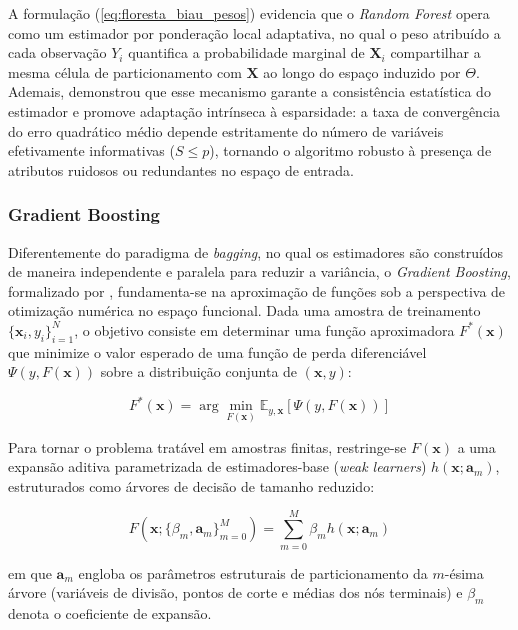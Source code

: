 A formulação (\ref{eq:floresta_biau_pesos}) evidencia que o \textit{Random Forest} opera como um estimador por ponderação local adaptativa, no qual o peso atribuído a cada observação $Y_i$ quantifica a probabilidade marginal de $\mathbf{X}_i$ compartilhar a mesma célula de particionamento com $\mathbf{X}$ ao longo do espaço induzido por $\Theta$. Ademais,  demonstrou que esse mecanismo garante a consistência estatística do estimador e promove adaptação intrínseca à esparsidade: a taxa de convergência do erro quadrático médio depende estritamente do número de variáveis efetivamente informativas ($S \le p$), tornando o algoritmo robusto à presença de atributos ruidosos ou redundantes no espaço de entrada.

\subsubsection{Gradient Boosting}

Diferentemente do paradigma de \textit{bagging}, no qual os estimadores são construídos de maneira independente e paralela para reduzir a variância, o \textit{Gradient Boosting}, formalizado por , fundamenta-se na aproximação de funções sob a perspectiva de otimização numérica no espaço funcional. Dada uma amostra de treinamento $\{\mathbf{x}_i, y_i\}_{i=1}^{N}$, o objetivo consiste em determinar uma função aproximadora $F^*(\mathbf{x})$ que minimize o valor esperado de uma função de perda diferenciável $\Psi(y, F(\mathbf{x}))$ sobre a distribuição conjunta de $(\mathbf{x}, y)$:

\begin{equation}
    F^*(\mathbf{x}) = \arg\min_{F(\mathbf{x})} \mathbb{E}_{y, \mathbf{x}}\left[\Psi(y, F(\mathbf{x}))\right] \label{eq:obj_friedman}
\end{equation}

Para tornar o problema tratável em amostras finitas, restringe-se $F(\mathbf{x})$ a uma expansão aditiva parametrizada de estimadores-base (\textit{weak learners}) $h(\mathbf{x}; \mathbf{a}_m)$, estruturados como árvores de decisão de tamanho reduzido:

\begin{equation}
    F(\mathbf{x}; \{\beta_m, \mathbf{a}_m\}_{m=0}^{M}) = \sum_{m=0}^{M} \beta_m h(\mathbf{x}; \mathbf{a}_m) \label{eq:expansao_aditiva_gb}
\end{equation}

\noindent em que $\mathbf{a}_m$ engloba os parâmetros estruturais de particionamento da $m$-ésima árvore (variáveis de divisão, pontos de corte e médias dos nós terminais) e $\beta_m$ denota o coeficiente de expansão.

